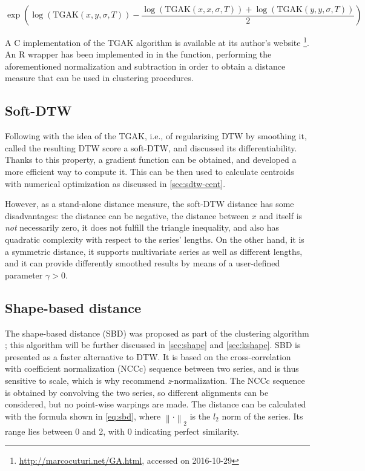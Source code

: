 \begin{equation}
\label{eq:tgak-norm}
\exp \left( \log\left( \text{TGAK}(x,y,\sigma,T) \right) - \frac{\log\left( \text{TGAK}(x,x,\sigma,T) \right) + \log\left( \text{TGAK}(y,y,\sigma,T) \right)}{2} \right)
\end{equation}

A C implementation of the TGAK algorithm is available at its author's website%
\footnote{\url{http://marcocuturi.net/GA.html}, accessed on 2016-10-29}.
An R wrapper has been implemented in \dtwclust{} in the  function,
performing the aforementioned normalization and subtraction in order to obtain a distance measure that can be used in clustering procedures.

\subsection{Soft-DTW}
\label{sec:sdtw}

Following with the idea of the TGAK,
i.e., of regularizing DTW by smoothing it,
\citet{cuturi2017} called the resulting DTW score a soft-DTW,
and discussed its differentiability.
Thanks to this property,
a gradient function can be obtained,
and \citet{cuturi2017} developed a more efficient way to compute it.
This can be then used to calculate centroids with numerical optimization as discussed in \cref{sec:sdtw-cent}.

However, as a stand-alone distance measure,
the soft-DTW distance has some disadvantages:
the distance can be negative,
the distance between $x$ and itself is \textit{not} necessarily zero,
it does not fulfill the triangle inequality,
and also has quadratic complexity with respect to the series' lengths.
On the other hand,
it is a symmetric distance,
it supports multivariate series as well as different lengths,
and it can provide differently smoothed results by means of a user-defined parameter $\gamma > 0$.

\subsection{Shape-based distance}
\label{sec:sbd}

The shape-based distance (SBD) was proposed as part of the \kshape{} clustering algorithm \citep{paparrizos2015};
this algorithm will be further discussed in \cref{sec:shape} and \cref{sec:kshape}.
SBD is presented as a faster alternative to DTW.
It is based on the cross-correlation with coefficient normalization (NCCc) sequence between two series,
and is thus sensitive to scale,
which is why \citet{paparrizos2015} recommend \textit{z}-normalization.
The NCCc sequence is obtained by convolving the two series,
so different alignments can be considered,
but no point-wise warpings are made.
The distance can be calculated with the formula shown in \cref{eq:sbd},
where $\left\lVert \cdot \right\rVert_2$ is the $l_2$ norm of the series.
Its range lies between 0 and 2, with 0 indicating perfect similarity.


